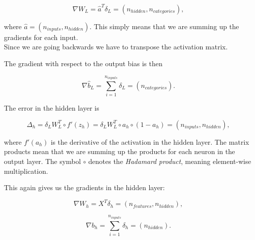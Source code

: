 \documentclass[11pt]{article}
\begin{document}
\[ \nabla W_{L} = \hat{a}^T \delta_L   = (n_{hidden}, n_{categories}) ,\]

where \(\hat{a} = (n_{inputs}, n_{hidden})\). This simply means that we
are summing up the gradients for each input.\\
Since we are going backwards we have to transpose the activation matrix.

The gradient with respect to the output bias is then

\[ \nabla \hat{b}_{L} = \sum_{i=1}^{n_{inputs}} \delta_L = (n_{categories}) .\]

The error in the hidden layer is

\[ \Delta_h = \delta_L W_{L}^T \circ f'(z_{h}) = \delta_L W_{L}^T \circ a_{h} \circ (1 - a_{h}) = (n_{inputs}, n_{hidden}) ,\]

where \(f'(a_{h})\) is the derivative of the activation in the hidden
layer. The matrix products mean that we are summing up the products for
each neuron in the output layer. The symbol \(\circ\) denotes the
\emph{Hadamard product}, meaning element-wise multiplication.

This again gives us the gradients in the hidden layer:

\[ \nabla W_{h} = X^T \delta_h = (n_{features}, n_{hidden}) ,\]

\[ \nabla b_{h} = \sum_{i=1}^{n_{inputs}} \delta_h = (n_{hidden}) .\]
\end{document}
